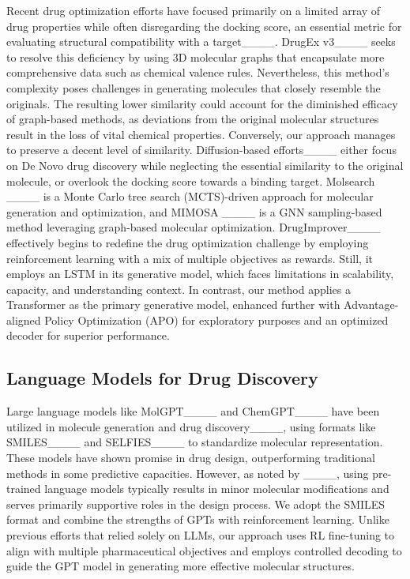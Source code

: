 Recent drug optimization efforts have focused primarily on a limited array of drug properties while often disregarding the docking score, an essential metric for evaluating structural compatibility with a target____. DrugEx v3____ seeks to resolve this deficiency by using 3D molecular graphs that encapsulate more comprehensive data such as chemical valence rules. Nevertheless, this method's complexity poses challenges in generating molecules that closely resemble the originals. The resulting lower similarity could account for the diminished efficacy of graph-based methods, as deviations from the original molecular structures result in the loss of vital chemical properties. Conversely, our approach manages to preserve a decent level of similarity. 
Diffusion-based efforts____ either focus on De Novo drug discovery while neglecting the essential similarity to the original molecule, or overlook the docking score towards a binding target.
Molsearch ____ is a Monte Carlo tree search (MCTS)-driven approach for molecular generation and optimization, 
and MIMOSA ____ is a GNN sampling-based method leveraging graph-based molecular optimization.
DrugImprover____ effectively begins to redefine the drug optimization challenge by employing reinforcement learning with a mix of multiple objectives as rewards. Still, it employs an LSTM in its generative model, which faces limitations in scalability, capacity, and understanding context. In contrast, our method applies a Transformer as the primary generative model, enhanced further with Advantage-aligned Policy Optimization (APO) for exploratory purposes and an optimized decoder for superior performance.








\subsection{Language Models for Drug Discovery}




Large language models like MolGPT____ and ChemGPT____ have been utilized in molecule generation and drug discovery____, using formats like SMILES____ and SELFIES____ to standardize molecular representation. These models have shown promise in drug design, outperforming traditional methods in some predictive capacities. However, as noted by ____, using pre-trained language models typically results in minor molecular modifications and serves primarily supportive roles in the design process. We adopt the SMILES format and combine the strengths of GPTs with reinforcement learning. Unlike previous efforts that relied solely on LLMs, our approach uses RL fine-tuning to align with multiple pharmaceutical objectives and employs controlled decoding to guide the GPT model in generating more effective molecular structures.

